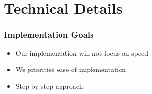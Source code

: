 \section{Technical Details}

\frame{\tableofcontents[currentsection]}

\begin{frame}
  \frametitle{Implementation Goals}
  \begin{itemize}
    \item Our implementation will not focus on speed
    \item We prioritise ease of implementation
    \item Step by step approach
  \end{itemize}
\end{frame}


